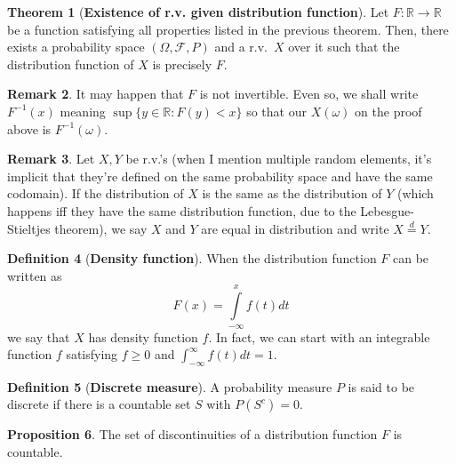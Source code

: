 \documentclass{article}
\theoremstyle{definition}
\newtheorem{theorem}{Theorem}[section]
\newtheorem{proposition}[theorem]{Proposition}
\newtheorem{definition}[theorem]{Definition}
\newtheorem{remark}[theorem]{Remark}
\begin{document}

\begin{theorem}[\textbf{Existence of r.v. given distribution function}]\label{thm:existence-rv}
    Let $F : \mathbb{R} \to \mathbb{R}$ be a function satisfying all properties listed in the previous theorem. Then, there exists a probability space $(\Omega, \mathcal{F}, P)$ and a r.v.\ $X$ over it such that the distribution function of $X$ is precisely $F$.
\end{theorem}


\begin{remark}
    It may happen that $F$ is not invertible. Even so, we shall write $F^{-1}(x)$ meaning $\sup \{ y \in \mathbb{R} : F(y) < x \}$ so that our $X(\omega)$ on the proof above is $F^{-1}(\omega)$.
\end{remark}

\begin{remark}
    Let $X, Y$ be r.v.'s (when I mention multiple random elements, it's implicit that they're defined on the same probability space and have the same codomain). If the distribution of $X$ is the same as the distribution of $Y$ (which happens iff they have the same distribution function, due to the Lebesgue-Stieltjes theorem), we say $X$ and $Y$ are equal in distribution and write $X \stackrel{d}{=} Y$.
\end{remark}

\begin{definition}[\textbf{Density function}]
    When the distribution function $F$ can be written as
    \[ F(x) = \int\limits_{-\infty}^x f(t) dt \]
    we say that $X$ has density function $f$. In fact, we can start with an integrable function $f$ satisfying $f \geq 0$ and $\int_{-\infty}^{\infty} f(t) dt = 1$.
\end{definition}

\begin{definition}[\textbf{Discrete measure}]
    A probability measure $P$ is said to be discrete if there is a countable set $S$ with $P(S^c) = 0$.
\end{definition}

\begin{proposition}
    The set of discontinuities of a distribution function $F$ is countable.
\end{proposition}
\end{document}
